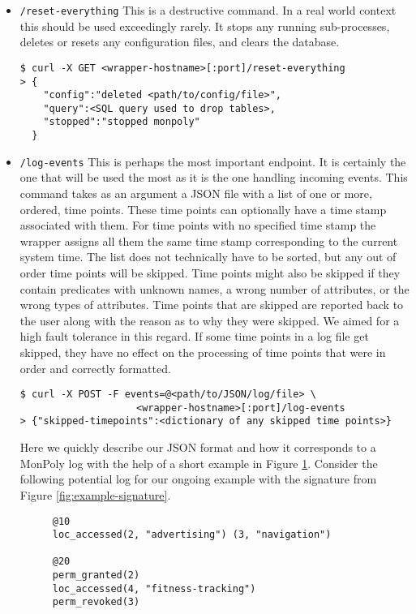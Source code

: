 \begin{itemize}
    \item \texttt{/reset-everything}
    This is a destructive command.
    In a real world context this should be used exceedingly rarely.
    It stops any running sub-processes, deletes or resets any configuration files, and clears the database.
    \begin{verbatim}
$ curl -X GET <wrapper-hostname>[:port]/reset-everything
> {
    "config":"deleted <path/to/config/file>",
    "query":<SQL query used to drop tables>,
    "stopped":"stopped monpoly"
  }
    \end{verbatim}
    \item \texttt{/log-events}
    This is perhaps the most important endpoint.
    It is certainly the one that will be used the most as it is the one handling incoming events.
    This command takes as an argument a JSON file with a list of one or more, ordered, time points.
    These time points can optionally have a time stamp associated with them.
    For time points with no specified time stamp the wrapper assigns all them the same time stamp corresponding to the current system time.
    The list does not technically have to be sorted, but any out of order time points will be skipped.
    Time points might also be skipped if they contain predicates with unknown names, a wrong number of attributes, or the wrong types of attributes.
    Time points that are skipped are reported back to the user along with the reason as to why they were skipped.
    We aimed for a high fault tolerance in this regard.
    If some time points in a log file get skipped, they have no effect on the processing of time points that were in order and correctly formatted.
    \begin{verbatim}
$ curl -X POST -F events=@<path/to/JSON/log/file> \
                    <wrapper-hostname>[:port]/log-events        
> {"skipped-timepoints":<dictionary of any skipped time points>}
    \end{verbatim}
    Here we quickly describe our JSON format and how it corresponds to a MonPoly log with the help of a short example in Figure \ref{fig:example-log-monpoly}.
    Consider the following potential log for our ongoing example with the signature from Figure \ref{fig:example-signature}.
\begin{figure}
    \label{fig:example-log-monpoly}
\begin{verbatim}
@10
loc_accessed(2, "advertising") (3, "navigation")

@20
perm_granted(2)
loc_accessed(4, "fitness-tracking")
perm_revoked(3)


\end{verbatim}
\end{figure}
\end{itemize}
